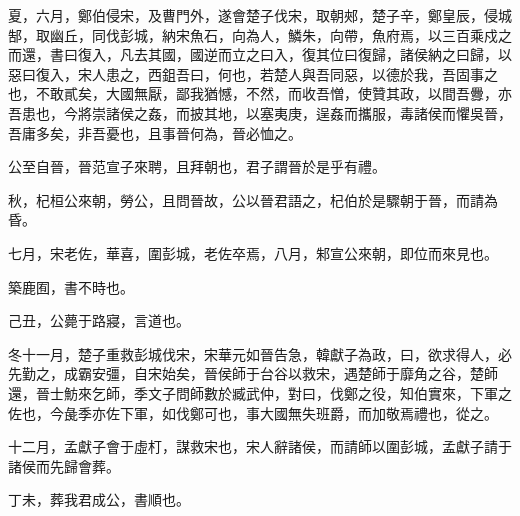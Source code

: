 \begin{pinyinscope}
夏，六月，鄭伯侵宋，及曹門外，遂會楚子伐宋，取朝郟，楚子辛，鄭皇辰，侵城郜，取幽丘，同伐彭城，納宋魚石，向為人，鱗朱，向帶，魚府焉，以三百乘戍之而還，書曰復入，凡去其國，國逆而立之曰入，復其位曰復歸，諸侯納之曰歸，以惡曰復入，宋人患之，西鉏吾曰，何也，若楚人與吾同惡，以德於我，吾固事之也，不敢貳矣，大國無厭，鄙我猶憾，不然，而收吾憎，使贊其政，以間吾釁，亦吾患也，今將崇諸侯之姦，而披其地，以塞夷庚，逞姦而攜服，毒諸侯而懼吳晉，吾庸多矣，非吾憂也，且事晉何為，晉必恤之。

公至自晉，晉范宣子來聘，且拜朝也，君子謂晉於是乎有禮。

秋，杞桓公來朝，勞公，且問晉故，公以晉君語之，杞伯於是驟朝于晉，而請為昏。

七月，宋老佐，華喜，圍彭城，老佐卒焉，八月，邾宣公來朝，即位而來見也。

築鹿囿，書不時也。

己丑，公薨于路寢，言道也。

冬十一月，楚子重救彭城伐宋，宋華元如晉告急，韓獻子為政，曰，欲求得人，必先勤之，成霸安彊，自宋始矣，晉侯師于台谷以救宋，遇楚師于靡角之谷，楚師還，晉士魴來乞師，季文子問師數於臧武仲，對曰，伐鄭之役，知伯實來，下軍之佐也，今彘季亦佐下軍，如伐鄭可也，事大國無失班爵，而加敬焉禮也，從之。

十二月，孟獻子會于虛朾，謀救宋也，宋人辭諸侯，而請師以圍彭城，孟獻子請于諸侯而先歸會葬。

丁未，葬我君成公，書順也。


\end{pinyinscope}